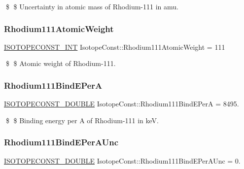 \$ \$ Uncertainty in atomic mass of Rhodium-\/111 in amu. \mbox{\label{group___isotope_const-_rhodium-_rh111_ga2af258cb77d391f90d9c498fdc00e142}} 
\subsubsection{\texorpdfstring{Rhodium111\+Atomic\+Weight}{Rhodium111AtomicWeight}}
{\footnotesize\ttfamily \mbox{\hyperlink{group___isotope_const-_macros_ga5f18360b3e99483a35c32d789e62621c}{I\+S\+O\+T\+O\+P\+E\+C\+O\+N\+S\+T\+\_\+\+I\+NT}} Isotope\+Const\+::\+Rhodium111\+Atomic\+Weight = 111}

\$ \$ Atomic weight of Rhodium-\/111. \mbox{\label{group___isotope_const-_rhodium-_rh111_ga118f6dc31f593ccb25eee77faba6f069}} 
\subsubsection{\texorpdfstring{Rhodium111\+Bind\+E\+PerA}{Rhodium111BindEPerA}}
{\footnotesize\ttfamily \mbox{\hyperlink{group___isotope_const-_macros_ga8f45a7272ce02c0b4c65c44636ed719a}{I\+S\+O\+T\+O\+P\+E\+C\+O\+N\+S\+T\+\_\+\+D\+O\+U\+B\+LE}} Isotope\+Const\+::\+Rhodium111\+Bind\+E\+PerA = 8495.}

\$ \$ Binding energy per A of Rhodium-\/111 in keV. \mbox{\label{group___isotope_const-_rhodium-_rh111_ga35ca3f03d5cc0148b19529e1703db76d}} 
\subsubsection{\texorpdfstring{Rhodium111\+Bind\+E\+Per\+A\+Unc}{Rhodium111BindEPerAUnc}}
{\footnotesize\ttfamily \mbox{\hyperlink{group___isotope_const-_macros_ga8f45a7272ce02c0b4c65c44636ed719a}{I\+S\+O\+T\+O\+P\+E\+C\+O\+N\+S\+T\+\_\+\+D\+O\+U\+B\+LE}} Isotope\+Const\+::\+Rhodium111\+Bind\+E\+Per\+A\+Unc = 0.}

